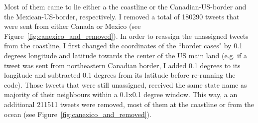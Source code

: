 \documentclass[11pt, a4paper,twoside]{report}\usepackage[]{graphicx}\usepackage[]{color}
\begin{document}
Most of them came to lie either a the coastline or the Canadian-US-border and the Mexican-US-border, respectively. I removed a total of 180290 tweets that were sent from either Canada or Mexico (see Figure~\ref{fig:canexico_and_removed}). In order to reassign the unassigned tweets from the coastline, I first changed the coordinates of the ``border cases" by 0.1 degrees longitude and latitude towards the center of the US main land (e.g. if a tweet was sent from northeastern Canadian border, I added 0.1 degrees to its longitude and subtracted 0.1 degrees from its latitude before re-running the code). Those tweets that were still unassigned, received the same state name as majority of their neighbours within a 0.1x0.1 degree window. This way, a an additional 211511 tweets were removed, most of them at the coastline or from the ocean (see Figure~\ref{fig:canexico_and_removed}).\newline
\end{document}
